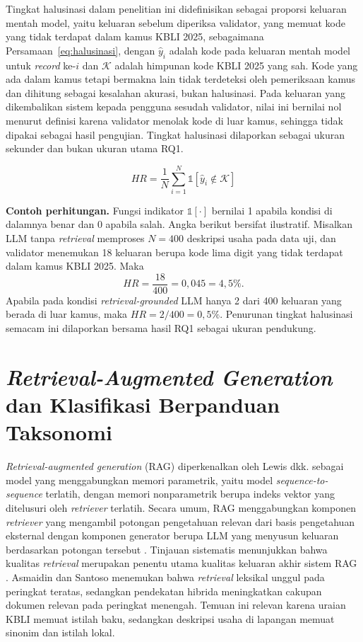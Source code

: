Tingkat halusinasi dalam penelitian ini didefinisikan sebagai proporsi keluaran mentah model, yaitu keluaran sebelum diperiksa validator, yang memuat kode yang tidak terdapat dalam kamus KBLI 2025, sebagaimana Persamaan~\eqref{eq:halusinasi}, dengan $\hat{y}_i$ adalah kode pada keluaran mentah model untuk \textit{record} ke-$i$ dan $\mathcal{K}$ adalah himpunan kode KBLI 2025 yang sah. Kode yang ada dalam kamus tetapi bermakna lain tidak terdeteksi oleh pemeriksaan kamus dan dihitung sebagai kesalahan akurasi, bukan halusinasi. Pada keluaran yang dikembalikan sistem kepada pengguna sesudah validator, nilai ini bernilai nol menurut definisi karena validator menolak kode di luar kamus, sehingga tidak dipakai sebagai hasil pengujian. Tingkat halusinasi dilaporkan sebagai ukuran sekunder dan bukan ukuran utama RQ1.

\begin{equation}
  HR = \frac{1}{N}\sum_{i=1}^{N} \mathbb{1}\left[\hat{y}_i \notin \mathcal{K}\right]
  \label{eq:halusinasi}
\end{equation}

\noindent\textbf{Contoh perhitungan.} Fungsi indikator $\mathbb{1}[\cdot]$ bernilai 1 apabila kondisi di dalamnya benar dan 0 apabila salah. Angka berikut bersifat ilustratif. Misalkan LLM tanpa \textit{retrieval} memproses $N = 400$ deskripsi usaha pada data uji, dan validator menemukan 18 keluaran berupa kode lima digit yang tidak terdapat dalam kamus KBLI 2025. Maka
\[
  HR = \frac{18}{400} = 0{,}045 = 4{,}5\%.
\]
Apabila pada kondisi \textit{retrieval-grounded} LLM hanya 2 dari 400 keluaran yang berada di luar kamus, maka $HR = 2/400 = 0{,}5\%$. Penurunan tingkat halusinasi semacam ini dilaporkan bersama hasil RQ1 sebagai ukuran pendukung.

\section{\textit{Retrieval-Augmented Generation} dan Klasifikasi Berpanduan Taksonomi}
\label{sec:rag}

\textit{Retrieval-augmented generation} (RAG) diperkenalkan oleh Lewis dkk. \cite{lewis2020rag} sebagai model yang menggabungkan memori parametrik, yaitu model \textit{sequence-to-sequence} terlatih, dengan memori nonparametrik berupa indeks vektor yang ditelusuri oleh \textit{retriever} terlatih. Secara umum, RAG menggabungkan komponen \textit{retriever} yang mengambil potongan pengetahuan relevan dari basis pengetahuan eksternal dengan komponen generator berupa LLM yang menyusun keluaran berdasarkan potongan tersebut \cite{gao2023ragsurvey}. Tinjauan sistematis menunjukkan bahwa kualitas \textit{retrieval} merupakan penentu utama kualitas keluaran akhir sistem RAG \cite{oche2025rag}. Asmaidin dan Santoso \cite{asmaidin2026retrieval} menemukan bahwa \textit{retrieval} leksikal unggul pada peringkat teratas, sedangkan pendekatan hibrida meningkatkan cakupan dokumen relevan pada peringkat menengah. Temuan ini relevan karena uraian KBLI memuat istilah baku, sedangkan deskripsi usaha di lapangan memuat sinonim dan istilah lokal.

